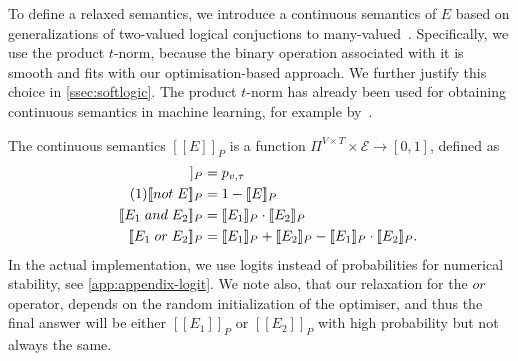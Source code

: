 \documentclass[acmsmall, review, anonymous]{acmart}\settopmatter{printfolios=true,printccs=false,printacmref=false}
\newcommand{\qqpi}[2]{[\![#2]\!]_{#1}}
\newcommand\numberthis{\addtocounter{equation}{1}\tag{\theequation}}
\newcommand{\margincomment}[2]{\marginpar{\scriptsize\color{Maroon}#1 says: #2}}
\newcommand{\ivp}[1]{\margincomment{IVP}{#1}}
\begin{document}
To define a relaxed semantics, we introduce a continuous semantics of $E$ based on generalizations of two-valued logical conjuctions
to many-valued~\cite{hajek96}.
Specifically, we use the product $t$-norm, because the binary operation associated with it is smooth and fits with our optimisation-based approach. We further justify this choice in \autoref{ssec:softlogic}.
The product $t$-norm has already been used for obtaining continuous semantics in machine learning, for example by~\citet{rocktaschel15}.


The continuous semantics $\qqpi{P}{E}$ is a function $\Pi^{V \times T} \times \mathcal{E} \rightarrow [0, 1]$,
defined as
\begin{align*}
	\qqpi{P}{x_v \mathrel{is} l_\tau} & = p_{v,\tau}                        \\  \numberthis \label{eq:logical}
	\qqpi{P}{\mathrel{not} E}         & = 1-\qqpi{P}{E}                     \\
	\qqpi{P}{E_1 \mathrel{and} E_2}   & = \qqpi{P}{E_1} \cdot \qqpi{P}{E_2} \\
	\qqpi{P}{E_1 \mathrel{or} E_2}    & =
	\qqpi{P}{E_1} + \qqpi{P}{E_2} - \qqpi{P}{E_1}\cdot\qqpi{P}{E_2}.
\end{align*}
In the actual implementation, we use logits instead of probabilities
for numerical stability, see \cref{app:appendix-logit}. We note also, that our relaxation for the $\mathrel{or}$ operator, depends on the random initialization of the optimiser, and thus the final answer will be 
either $\qqpi{P}{E_1}$ or $\qqpi{P}{E_2}$ with high probability but 
not always the same.
\end{document}
